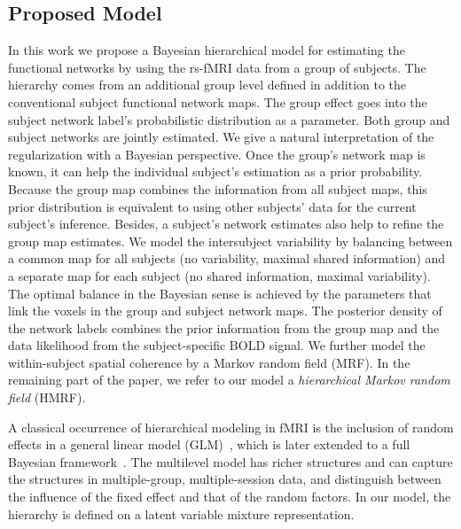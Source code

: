 \documentclass[review,authoryear]{elsarticle}
\begin{document}
\subsection{Proposed Model}
In this work we propose a Bayesian hierarchical model for estimating the
functional networks by using the rs-fMRI data from a group of subjects. The
hierarchy comes from an additional group level defined in addition to the
conventional subject functional network maps. The group effect goes into the
subject network label's probabilistic distribution as a parameter. Both group
and subject networks are jointly estimated. We give a natural interpretation of
the regularization with a Bayesian perspective. Once the group's network map is
known, it can help the individual subject's estimation as a prior probability.
Because the group map combines the information from all subject maps, this prior
distribution is equivalent to using other subjects' data for the current
subject's inference.  Besides, a subject's network estimates also help to refine
the group map estimates. We model the intersubject variability by balancing
between a common map for all subjects (no variability, maximal shared
information) and a separate map for each subject (no shared information, maximal
variability). The optimal balance in the Bayesian sense is achieved by the
parameters that link the voxels in the group and subject network maps.  The
posterior density of the network labels combines the prior information from the
group map and the data likelihood from the subject-specific BOLD signal. We
further model the within-subject spatial coherence by a Markov random field
(MRF). In the remaining part of the paper, we refer to our model a
\emph{hierarchical Markov random field} (HMRF).

A classical occurrence of hierarchical modeling in fMRI is the inclusion of
random effects in a general linear model (GLM)~\citep{beckmann2003general},
which is later extended to a full Bayesian
framework~\citep{woolrich2004multilevel}. The multilevel model has richer
structures and can capture the structures in multiple-group, multiple-session
data, and distinguish between the influence of the fixed effect and that of the
random factors. In our model, the hierarchy is defined on a latent variable
mixture representation.
\end{document}
